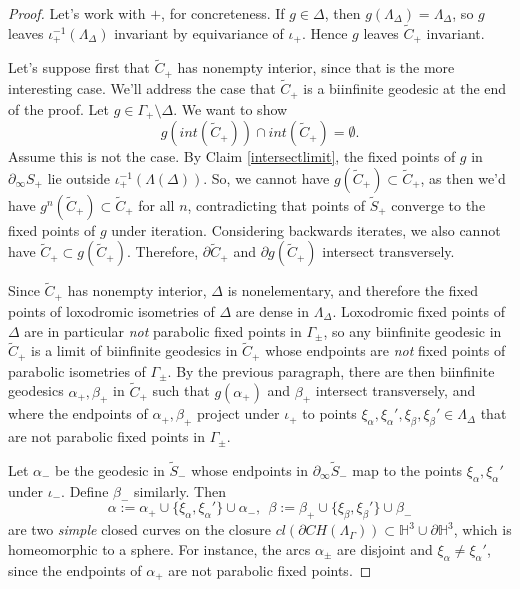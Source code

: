 \documentclass[10pt,a4paper]{amsart}
\newcommand{\BH}{\mathbb H}
\begin{document}
\begin{proof}
	Let's work with $+$, for concreteness. If $g \in \Delta$, then $g(\Lambda_\Delta)=\Lambda_\Delta$, so $g$ leaves $\iota_+^{-1}(\Lambda_\Delta)$ invariant by equivariance of $\iota_+$. Hence $g$ leaves $\tilde C_+$ invariant.
	
	Let's suppose first that $\tilde C_+$ has nonempty interior, since that is the more interesting case. We'll address the case that $\tilde C_+$ is a biinfinite geodesic at the end of the proof. Let $g\in \Gamma_+\setminus \Delta$.  We want to show $$g(int(\tilde C_+)) \cap int(\tilde C_+)=\emptyset.$$ Assume this is not the case. By Claim \ref{intersectlimit}, the fixed points of $g$ in $\partial_\infty S_+$ lie outside $\iota_+^{-1}(\Lambda(\Delta))$. So, we cannot have $g(\tilde C_+)\subset \tilde C_+$, as then we'd have $g^n(\tilde C_+)\subset \tilde C_+$ for all $n$, contradicting that points of $\tilde S_+$ converge to the fixed points of $g$ under iteration. Considering backwards iterates, we also cannot have $\tilde C_+ \subset g(\tilde C_+)$. Therefore, $\partial \tilde C_+$ and $\partial g(\tilde C_+)$ intersect transversely. 
	
	Since $\tilde C_+$ has nonempty interior, $\Delta$ is nonelementary, and therefore the fixed points of loxodromic isometries of $\Delta$ are dense in $\Lambda_\Delta$. Loxodromic fixed points of $\Delta$ are in particular \emph{not} parabolic fixed points in $\Gamma_\pm$, so any biinfinite geodesic in $\tilde C_+$ is a limit of biinfinite geodesics in $\tilde C_+$ whose endpoints are \emph{not} fixed points of parabolic isometries of $\Gamma_\pm$. By the previous paragraph, there are then  biinfinite geodesics $\alpha_+,\beta_+$ in $\tilde C_+$ such that $g(\alpha_+)$ and $\beta_+$ intersect transversely, and where the endpoints of $\alpha_+,\beta_+$ project under $\iota_+$ to points $\xi_\alpha,\xi_\alpha',\xi_\beta,\xi_\beta'\in \Lambda_\Delta$ that are not parabolic fixed points in $\Gamma_\pm$.
	
	Let $\alpha_-$ be the geodesic in $\tilde S_-$ whose endpoints in $\partial_\infty \tilde S_-$ map to the points $\xi_\alpha,\xi_\alpha'$ under  $\iota_-$.  Define $\beta_-$ similarly. Then
	$$\alpha:= \alpha_+ \cup \{\xi_\alpha,\xi_\alpha'\} \cup \alpha_-, \ \ \beta:= \beta_+ \cup \{\xi_\beta,\xi_\beta'\} \cup \beta_-$$
	are two \emph{simple} closed curves on the closure $cl(\partial CH(\Lambda_\Gamma))\subset \BH^3 \cup \partial \BH^3$, which is homeomorphic to a sphere. For instance, the arcs $\alpha_\pm$ are disjoint and $\xi_\alpha\neq \xi_\alpha'$, since the endpoints of $\alpha_+$ are not parabolic fixed points.
	

\end{proof}
\end{document}
